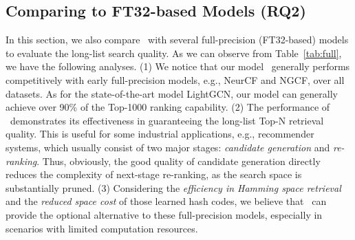 \subsection{\textbf{Comparing to FT32-based Models (RQ2)}}
\label{sec:exp_full}
\begin{table}[t]
\centering
\scriptsize
\caption{NDCG@1000 results of Float32-based models.}
\vspace{-0.15in}
\label{tab:full}
\end{table}



In this section, we also compare \model~with several full-precision (FT32-based) models to evaluate the long-list search quality. 
As we can observe from Table~\ref{tab:full}, we have the following analyses.
(1) We notice that our model \model~generally performs competitively with early full-precision models, e.g., NeurCF and NGCF, over all datasets.
As for the state-of-the-art model LightGCN, our model can generally achieve over 90\% of the Top-1000 ranking capability.
(2) The performance of \model~demonstrates its effectiveness in guaranteeing the long-list Top-N retrieval quality.
This is useful for some industrial applications, e.g., recommender systems, which usually consist of two major stages: \textit{candidate generation} and \textit{re-ranking}.
Thus, obviously, the good quality of candidate generation directly reduces the complexity of next-stage re-ranking, as the search space is substantially pruned.
(3) Considering the \textit{efficiency in Hamming space retrieval} and the \textit{reduced space cost} of those learned hash codes, we believe that \model~can provide the optional alternative to these full-precision models, especially in scenarios with limited computation resources.

